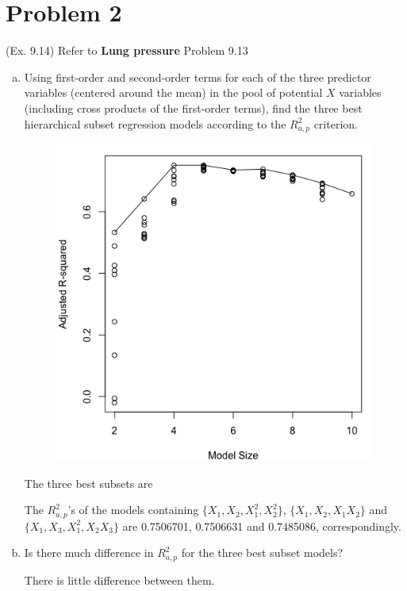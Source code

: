 \documentclass[10pt]{report}
\begin{document}
\section*{Problem 2}
(Ex. 9.14) Refer to \textbf{Lung pressure} Problem 9.13
\begin{enumerate}[a.]
	\item 
	Using first-order and second-order terms for each of the three predictor variables (centered around the mean) in the pool of potential $X$ variables (including cross products of the first-order terms), find the three best hierarchical subset regression models according to the $R_{a,p}^2$ criterion.
	\begin{figure}[H]
		\centering
		\includegraphics[width=.5\linewidth]{p2/14a.png}
	\end{figure}
	The three best subsets are
	
	The $R_{a,p}^2$'s of the models containing $\{X_1, X_2, X_1^2, X_2^2\}$, $\{X_1, X_2, X_1 X_2\}$ and $\{X_1, X_3, X_1^2, X_2 X_3\}$ are 0.7506701, 0.7506631 and 0.7485086, correspondingly.
	
	\item 
	Is there much difference in $R_{a,p}^2$ for the three best subset models?
	
	There is little difference between them.
\end{enumerate}
\end{document}
